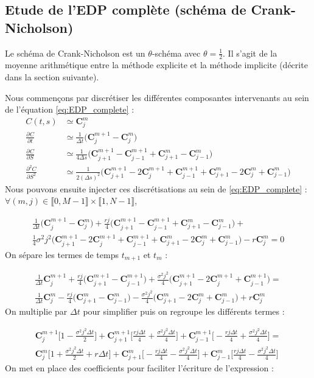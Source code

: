 \documentclass[11pt,a4paper]{article}
\newcommand{\deriv}[3][]{%
  \ensuremath{\frac{\partial^{#1} {#2}}{\partial {#3}^{#1}}}}
\newcommand*{\intval}[2]{\llbracket #1, #2 \rrbracket}
\newcommand*{\C}[2]{\mathbf{C}^{#1}_{#2}}
\theoremstyle{plain}
\begin{document}
\subsection{Etude de l'EDP complète (schéma de Crank-Nicholson)}
Le schéma de Crank-Nicholson est un $\theta$-schéma avec $\theta = \frac{1}{2}$. Il s'agit de la moyenne arithmétique entre la méthode explicite et la méthode implicite (décrite dans la section suivante).

Nous commençons par discrétiser les différentes composantes intervenants au sein de l'équation \eqref{eq:EDP_complete} :
\begin{align*}
    C(t, s) &\simeq \C{m}{j} \\
    \deriv{C}{t} &\simeq \frac{1}{\Delta t}\Big(\C{m + 1}{j} - \C{m}{j}\Big) \\
    \deriv{C}{S} &\simeq \frac{1}{4\Delta s}\Big(\C{m + 1}{j + 1} - \C{m + 1}{j - 1} + \C{m}{j + 1} - \C{m}{j - 1}\Big) \\
    \deriv[2]{C}{S} &\simeq \frac{1}{2(\Delta s)^2}\Big(\C{m + 1}{j + 1} - 2\C{m + 1}{j} + \C{m + 1}{j - 1} + \C{m}{j + 1} - 2\C{m}{j} + \C{m}{j - 1}\Big)
\end{align*}
Nous pouvons ensuite injecter ces discrétisations au sein de \eqref{eq:EDP_complete} : $\forall (m, j) \in \intval{0}{M - 1} \times \intval{1}{N - 1}$, 

\begin{align*}
    \frac{1}{\Delta t}\Big(\C{m + 1}{j} - \C{m}{j}\Big) + \frac{rj}{4}\Big(\C{m + 1}{j + 1} - \C{m + 1}{j - 1} + \C{m}{j + 1} - \C{m}{j - 1}\Big) + \\
\frac{1}{4}\sigma^2j^2\Big(\C{m + 1}{j + 1} - 2\C{m + 1}{j} + \C{m + 1}{j - 1} + \C{m}{j + 1} - 2\C{m}{j} + \C{m}{j - 1}\Big) - r\C{m}{j} = 0
\end{align*}
On sépare les termes de temps $t_{m + 1}$ et $t_m$ :

\begin{align*}
    \frac{1}{\Delta t}\C{m + 1}{j} + \frac{rj}{4}\Big(\C{m + 1}{j + 1} - \C{m + 1}{j - 1}\Big) + \frac{\sigma^2j^2}{4}\Big(\C{m + 1}{j + 1} - 2\C{m + 1}{j} + \C{m + 1}{j - 1}\Big) = \\
    \frac{1}{\Delta t}\C{m}{j} - \frac{rj}{4}\Big(\C{m}{j + 1} - \C{m}{j - 1}\Big) - \frac{\sigma^2j^2}{4}\Big(\C{m}{j + 1} - 2\C{m}{j} + \C{m}{j - 1}\Big) + r\C{m}{j}
\end{align*}
On multiplie par $\Delta t$ pour simplifier puis on regroupe les différents termes :

\begin{align*}
    \C{m + 1}{j}\Big[1 - \frac{\sigma^2j^2\Delta t}{2} \Big] + \C{m + 1}{j + 1}\Big[\frac{rj\Delta t}{4} + \frac{\sigma^2j^2\Delta t}{4}\Big] + \C{m + 1}{j - 1}\Big[-\frac{rj\Delta t}{4} + \frac{\sigma^2j^2\Delta t}{4}\Big] = \\
    \C{m}{j}\Big[1 + \frac{\sigma^2j^2\Delta t}{2} + r\Delta t\Big] + \C{m}{j + 1}\Big[-\frac{rj\Delta t}{4} - \frac{\sigma^2j^2\Delta t}{4}\Big] + \C{m}{j - 1}\Big[\frac{rj\Delta t}{4} - \frac{\sigma^2j^2\Delta t}{4}\Big]
\end{align*}
On met en place des coefficients pour faciliter l'écriture de l'expression :
\end{document}
